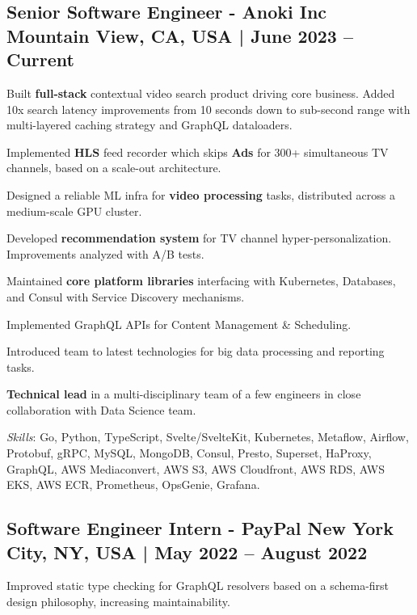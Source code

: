 \subsection{{Senior Software Engineer - Anoki Inc \hfill  Mountain View, CA, USA  | June 2023 -- Current}}
\begin{zitemize}
\item Built \textbf{full-stack} contextual video search product driving core business. Added 10x search latency improvements from 10 seconds down to sub-second range with multi-layered caching strategy and GraphQL dataloaders. 
\item Implemented \textbf{HLS} feed recorder which skips \textbf{Ads} for 300+ simultaneous TV channels, based on a scale-out architecture.
\item Designed a reliable ML infra for \textbf{video processing} tasks, distributed across a medium-scale GPU cluster. 
\item Developed \textbf{recommendation system} for TV channel hyper-personalization. Improvements analyzed with A/B tests.
\item Maintained \textbf{core platform libraries} interfacing with Kubernetes, Databases, and Consul with Service Discovery mechanisms.
\item Implemented GraphQL APIs for Content Management \& Scheduling.
\item Introduced team to latest technologies for big data processing and reporting tasks.
\item \textbf{Technical lead} in a multi-disciplinary team of a few engineers in close collaboration with Data Science team.
\end{zitemize}
\textit{Skills}: Go, Python, TypeScript, Svelte/SvelteKit, Kubernetes, Metaflow, Airflow, Protobuf, gRPC, MySQL, MongoDB, Consul, Presto, Superset, HaProxy, GraphQL, AWS Mediaconvert, AWS S3, AWS Cloudfront, AWS RDS, AWS EKS, AWS ECR, Prometheus, OpsGenie, Grafana.
\vspace*{2mm}
\subsection{{Software Engineer Intern - PayPal \hfill New York City, NY, USA | May 2022 -- August 2022}}
\begin{zitemize}
\item Improved static type checking for GraphQL resolvers based on a schema-first design philosophy, increasing maintainability.
\end{zitemize}

